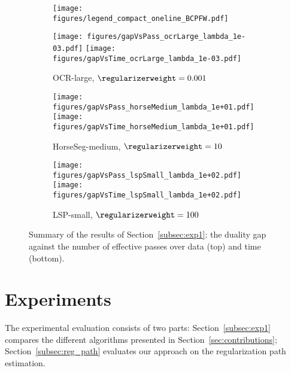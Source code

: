 \documentclass{article}
\begin{document}
\begin{figure*}[t]
    \centering
    \begin{subfigure}[b]{\textwidth}
        \centering
        \texttt{[image: figures/legend\_compact\_oneline\_BCPFW.pdf]}
    \end{subfigure}
    \begin{subfigure}[b]{0.29\textwidth}
        \texttt{[image: figures/gapVsPass\_ocrLarge\_lambda\_1e-03.pdf]}
        \texttt{[image: figures/gapVsTime\_ocrLarge\_lambda\_1e-03.pdf]}
        \caption{OCR-large, $\regularizerweight=0.001$\label{fig:exp1_main_a}\vspace{-2mm}}
    \end{subfigure}
    \qquad
    \begin{subfigure}[b]{0.29\textwidth}
        \texttt{[image: figures/gapVsPass\_horseMedium\_lambda\_1e+01.pdf]}
        \texttt{[image: figures/gapVsTime\_horseMedium\_lambda\_1e+01.pdf]}
        \caption{HorseSeg-medium, $\regularizerweight=10$\label{fig:exp1_main_b}\vspace{-2mm}}
    \end{subfigure}
    \qquad
    \begin{subfigure}[b]{0.29\textwidth}
        \texttt{[image: figures/gapVsPass\_lspSmall\_lambda\_1e+02.pdf]}
        \texttt{[image: figures/gapVsTime\_lspSmall\_lambda\_1e+02.pdf]}
        \caption{LSP-small, $\regularizerweight=100$\label{fig:exp1_main_c}\vspace{-2mm}}
    \end{subfigure}
    \caption{Summary of the results of Section~\ref{subsec:exp1}: the duality gap against the number of effective passes over data (top) and time (bottom).
        \label{fig:exp1_main} \vspace{-4.5mm}  
    }
\end{figure*}


%


%
%
%

%
%



%
%
%
%
%
%
%
%
%
%
%
%
%
%
%
%
%
%
%
%
%
%
%
%

\section{Experiments}\label{sec:experiments}
The experimental evaluation consists of two parts:
Section~\ref{subsec:exp1} compares the different algorithms presented in Section~\ref{sec:contributions};
Section~\ref{subsec:reg_path} evaluates our approach on the regularization path estimation. %
\end{document}
